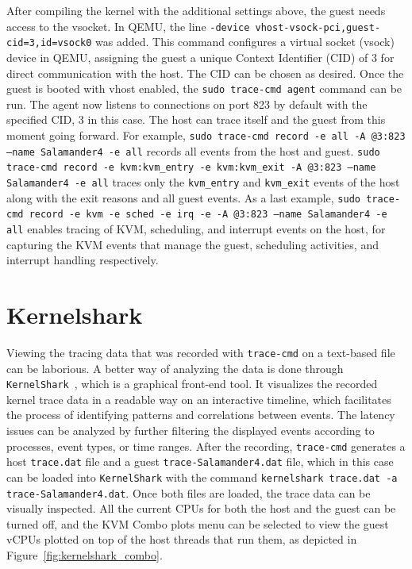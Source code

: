 \documentclass[MMR,Master,english]{style/twbook}
\begin{document}
\clearpage

\noindent After compiling the kernel with the additional settings above, the guest needs access to the vsocket. In QEMU, the line \texttt{-device vhost-vsock-pci,guest-cid=3,id=vsock0} was added. This command configures a virtual socket (vsock) device in QEMU, assigning the guest a unique Context Identifier (CID) of 3 for direct communication with the host. The CID can be chosen as desired. Once the guest is booted with vhost enabled, the \texttt{sudo trace-cmd agent} command can be run.  The agent now listens to connections on port 823 by default with the specified CID, 3 in this case. The host can trace itself and the guest from this moment going forward. For example, \texttt{sudo trace-cmd record -e all -A @3:823 --name Salamander4 -e all} records all events from the host and guest. \texttt{sudo trace-cmd record -e kvm:kvm\_entry -e kvm:kvm\_exit -A @3:823 --name Salamander4 -e all} traces only the \texttt{kvm\_entry} and \texttt{kvm\_exit} events of the host along with the exit reasons and all guest events. As a last example, \texttt{sudo trace-cmd record -e kvm -e sched -e irq -e -A @3:823 --name Salamander4 -e all} enables tracing of KVM, scheduling, and interrupt events on the host, for capturing the KVM events that manage the guest, scheduling activities, and interrupt handling respectively.

\section{Kernelshark}\label{sec:kernelshark}
Viewing the tracing data that was recorded with \texttt{trace-cmd} on a text-based file can be laborious. A better way of analyzing the data is done through \texttt{KernelShark}~\cite{KernelShark}, which is a graphical front-end tool. It visualizes the recorded kernel trace data in a readable way on an interactive timeline, which facilitates the process of identifying patterns and correlations between events. The latency issues can be analyzed by further filtering the displayed events according to processes, event types, or time ranges. After the recording, \texttt{trace-cmd} generates a host \texttt{trace.dat} file and a guest \texttt{trace-Salamander4.dat} file, which in this case can be loaded into \texttt{KernelShark} with the command \texttt{kernelshark trace.dat -a trace-Salamander4.dat}. Once both files are loaded, the trace data can be visually inspected. All the current CPUs for both the host and the guest can be turned off, and the KVM Combo plots menu can be selected to view the guest vCPUs plotted on top of the host threads that run them, as depicted in Figure~\ref{fig:kernelshark_combo}.
\end{document}

